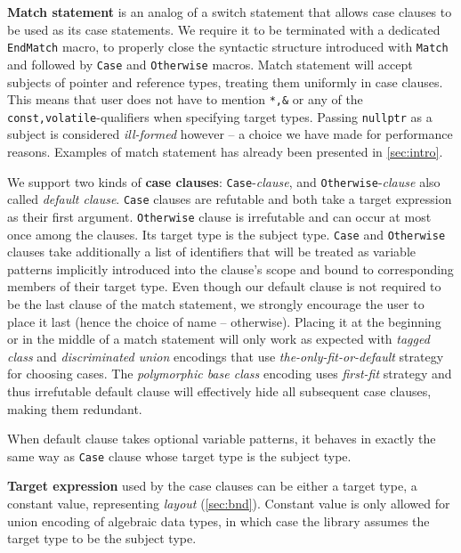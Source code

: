 \documentclass[preprint]{sigplanconf}
\makeatletter
\DeclareRobustCommand{\code}[1]{{\lstinline[breaklines=false,escapechar=@]{#1}}}
\makeatother
\begin{document}
\noindent
{\bf Match statement} is an analog of a switch statement that allows case 
clauses to be used as its case statements. We require it to be terminated with a 
dedicated \code{EndMatch} macro, to properly close the syntactic structure 
introduced with \code{Match} and followed by \code{Case} and 
\code{Otherwise} macros. Match statement will accept subjects of pointer and 
reference types, treating them uniformly in case clauses. This means that user 
does not have to mention \code{*,&} or any of the \code{const,volatile}-qualifiers
when specifying target types. Passing \code{nullptr} as a subject is considered 
\emph{ill-formed} however -- a choice we have made for performance reasons. 
Examples of match statement has already been presented in 
\textsection\ref{sec:intro}.

We support two kinds of {\bf case clauses}: \code{Case}-\emph{clause}, 
 and \code{Otherwise}-\emph{clause} also called 
\emph{default clause}. \code{Case} clauses are refutable and both 
take a target expression as their first argument. \code{Otherwise} clause is 
irrefutable and can occur at most once among the clauses. Its target type is 
the subject type. \code{Case} and \code{Otherwise} clauses take additionally a 
list of identifiers that will be treated as variable patterns implicitly 
introduced into the clause's scope and bound to corresponding members of their 
target type. Even though our default clause is not required to be the last 
clause of the match statement, we strongly encourage the user to place it 
last (hence the choice of name -- otherwise). Placing it at the beginning or in 
the middle of a match statement will only work as expected with \emph{tagged 
class} and \emph{discriminated union} encodings that use 
\emph{the-only-fit-or-default} strategy for choosing cases. The 
\emph{polymorphic base class} encoding uses \emph{first-fit} strategy and thus 
irrefutable default clause will effectively hide all subsequent case 
clauses, making them redundant. 

When default clause takes optional variable patterns, it behaves in 
exactly the same way as \code{Case} clause whose target type is the subject 
type.

{\bf Target expression} used by the case clauses can be either a target type, 
a constant value, representing \emph{layout} (\textsection\ref{sec:bnd}). Constant value 
is only allowed for union encoding of algebraic data types, in which case the 
library assumes the target type to be the subject type.
\end{document}
